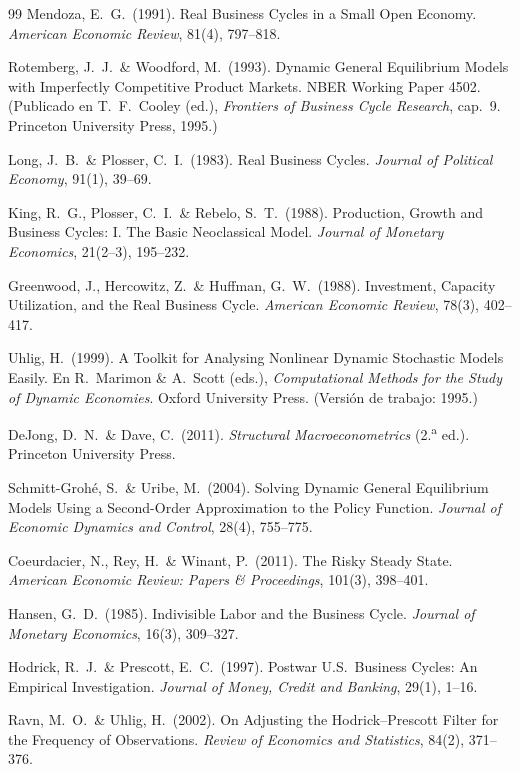 \documentclass[11pt,a4paper]{report}
\begin{document}
\begin{thebibliography}{99}
 Mendoza, E.~G.\ (1991). Real Business Cycles in a Small Open
Economy. \emph{American Economic Review}, 81(4), 797--818.

 Rotemberg, J.~J.\ \& Woodford, M.\ (1993). Dynamic
General Equilibrium Models with Imperfectly Competitive Product Markets. NBER Working
Paper 4502. (Publicado en T.~F.\ Cooley (ed.), \emph{Frontiers of Business Cycle
Research}, cap.~9. Princeton University Press, 1995.)

 Long, J.~B.\ \& Plosser, C.~I.\ (1983). Real Business
Cycles. \emph{Journal of Political Economy}, 91(1), 39--69.

 King, R.~G., Plosser, C.~I.\ \& Rebelo, S.~T.\ (1988). Production,
Growth and Business Cycles: I. The Basic Neoclassical Model. \emph{Journal of Monetary
Economics}, 21(2--3), 195--232.

 Greenwood, J., Hercowitz, Z.\ \& Huffman, G.~W.\ (1988). Investment,
Capacity Utilization, and the Real Business Cycle. \emph{American Economic Review},
78(3), 402--417.

 Uhlig, H.\ (1999). A Toolkit for Analysing Nonlinear Dynamic
Stochastic Models Easily. En R.\ Marimon \& A.\ Scott (eds.), \emph{Computational
Methods for the Study of Dynamic Economies}. Oxford University Press. (Versión de
trabajo: 1995.)

 DeJong, D.~N.\ \& Dave, C.\ (2011). \emph{Structural
Macroeconometrics} (2.\textsuperscript{a} ed.). Princeton University Press.

 Schmitt-Grohé, S.\ \& Uribe, M.\ (2004). Solving Dynamic
General Equilibrium Models Using a Second-Order Approximation to the Policy
Function. \emph{Journal of Economic Dynamics and Control}, 28(4), 755--775.

 Coeurdacier, N., Rey, H.\ \& Winant, P.\ (2011). The Risky
Steady State. \emph{American Economic Review: Papers \& Proceedings}, 101(3),
398--401.

 Hansen, G.~D.\ (1985). Indivisible Labor and the Business
Cycle. \emph{Journal of Monetary Economics}, 16(3), 309--327.

 Hodrick, R.~J.\ \& Prescott, E.~C.\ (1997). Postwar U.S.\
Business Cycles: An Empirical Investigation. \emph{Journal of Money, Credit and
Banking}, 29(1), 1--16.

 Ravn, M.~O.\ \& Uhlig, H.\ (2002). On Adjusting the
Hodrick--Prescott Filter for the Frequency of Observations. \emph{Review of
Economics and Statistics}, 84(2), 371--376.


\end{thebibliography}
\end{document}

